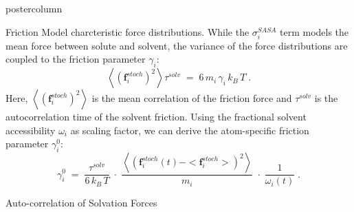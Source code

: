 \documentclass{beamer}
\newcommand{\sig}{$\sigma_i^{SASA}$}
\newcommand{\gam}{$\gamma_i^0$}
\begin{document}
\begin{frame}
\begin{columns}
\begin{column}{.45\textwidth}
\begin{beamercolorbox}[center]{postercolumn}
\begin{minipage}{.98\textwidth}
{\begin{myblock}{Friction Model}
charcteristic force distributions. While the \sig{} term models the mean
force between solute and solvent, the variance of the force distributions
are coupled to the friction parameter $\gamma_i$:
\begin{equation}
\left< (\mathbf{f}_i^{stoch})^2 \right> \tau^{solv} \; = \; 6 \, m_i \, \gamma_i \, k_B \, T \; .
\label{eq:stoch}
\end{equation}
Here, $\left< (\mathbf{f}_i^{stoch})^2 \right>$ is the mean correlation of the
friction force and $\tau^{solv}$ is the autocorrelation time of the solvent friction.
Using the fractional solvent accessibility $\omega_i$ as scaling factor,
we can derive the atom-specific friction parameter \gam:
\begin{equation}
\gamma^0_i \; = \; \frac{\tau^{solv}}{{6 \, k_B \, T}} \; \cdot \; \frac{\left< (\mathbf{f}_i^{stoch}(t) - <\mathbf{f}_i^{stoch}>)^2 \right>}{m_i} \; \cdot \; \frac{1}{\omega_i(t)} \; .
\label{eq:gamma0}
\end{equation} 
\end{myblock}\vfill
\begin{myblock}{Auto-correlation of Solvation Forces}
\begin{figure}
\begin{minipage}{1.0\textwidth}
 \\

\end{minipage}
\end{figure}
\end{myblock}}
\end{minipage}
\end{beamercolorbox}
\end{column}
\end{columns}
\end{frame}
\end{document}
